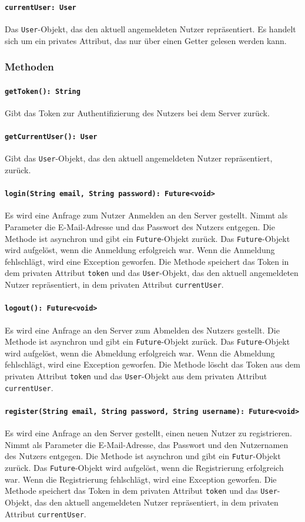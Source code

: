 \documentclass[parskip=full]{scrartcl}
\begin{document}
\paragraph{\texttt{currentUser: User}}
Das \texttt{User}-Objekt, das den aktuell angemeldeten Nutzer repräsentiert. Es handelt sich um ein privates Attribut, das nur über einen Getter gelesen werden kann.
\subsubsection*{Methoden}
\paragraph{\texttt{getToken(): String}}
Gibt das Token zur Authentifizierung des Nutzers bei dem Server zurück.
\paragraph{\texttt{getCurrentUser(): User}}
Gibt das \texttt{User}-Objekt, das den aktuell angemeldeten Nutzer repräsentiert, zurück.
\paragraph{\texttt{login(String email, String password): Future<void>}}
Es wird eine Anfrage zum Nutzer Anmelden an den Server gestellt. Nimmt als Parameter die E-Mail-Adresse und das Passwort des Nutzers entgegen. Die Methode ist asynchron und gibt ein \texttt{Future}-Objekt zurück. Das \texttt{Future}-Objekt wird aufgelöst, wenn die Anmeldung erfolgreich war. Wenn die Anmeldung fehlschlägt, wird eine Exception geworfen. Die Methode speichert das Token in dem privaten Attribut \texttt{token} und das \texttt{User}-Objekt, das den aktuell angemeldeten Nutzer repräsentiert, in dem privaten Attribut \texttt{currentUser}.
\paragraph{\texttt{logout(): Future<void>}}
Es wird eine Anfrage an den Server zum Abmelden des Nutzers gestellt. Die Methode ist asynchron und gibt ein \texttt{Future}-Objekt zurück. Das \texttt{Future}-Objekt wird aufgelöst, wenn die Abmeldung erfolgreich war. Wenn die Abmeldung fehlschlägt, wird eine Exception geworfen. Die Methode löscht das Token aus dem privaten Attribut \texttt{token} und das \texttt{User}-Objekt aus dem privaten Attribut \texttt{currentUser}.
\paragraph{\texttt{register(String email, String password, String username): Future<void>}}
Es wird eine Anfrage an den Server gestellt, einen neuen Nutzer zu registrieren. Nimmt als Parameter die E-Mail-Adresse, das Passwort und den Nutzernamen des Nutzers entgegen. Die Methode ist asynchron und gibt ein \texttt{Futur}-Objekt zurück. Das \texttt{Future}-Objekt wird aufgelöst, wenn die Registrierung erfolgreich war. Wenn die Registrierung fehlschlägt, wird eine Exception geworfen. Die Methode speichert das Token in dem privaten Attribut \texttt{token} und das \texttt{User}-Objekt, das den aktuell angemeldeten Nutzer repräsentiert, in dem privaten Attribut \texttt{currentUser}.
\end{document}
